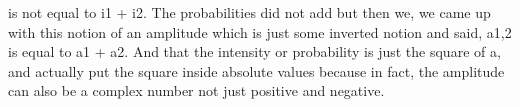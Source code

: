 \documentclass{article}
\newcommand{\<}{\langle}
\renewcommand{\>}{\rangle}
\begin{document}
is not equal to i1 + i2. The probabilities did not add but then we, we came up with this notion of an amplitude which is just some inverted notion and said, a1,2 is equal to a1 + a2. And that the intensity or probability is just the square of a, and actually put the square inside absolute values because in fact, the amplitude can also be a complex number not just positive and negative.
\end{document}
